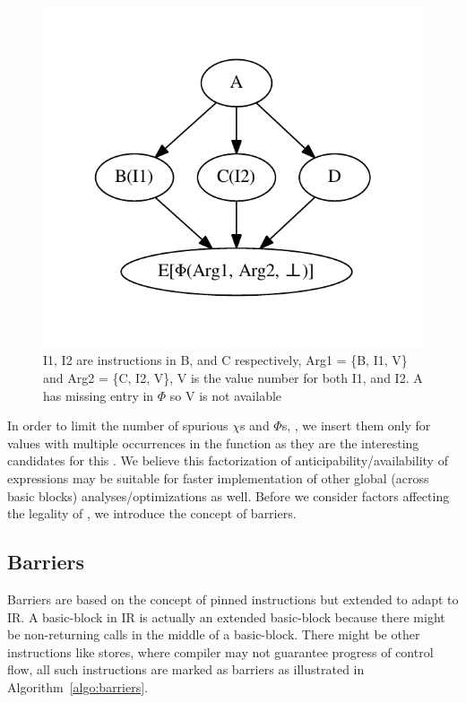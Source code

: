\documentclass[sigplan,10pt,review,anonymous]{acmart}\settopmatter{printfolios=true,printccs=false,printacmref=false}
\begin{document}
\begin{figure}[h]
  \includegraphics[scale=0.55]{phi-example.pdf}
  \vspace*{-1.0cm}
  \caption{I1, I2 are instructions in B, and C respectively, Arg1 = \{B, I1, V\}
  and Arg2 = \{C, I2, V\}, V is the value number for both I1, and I2. A has
  missing entry in $\Phi$ so V is not available}
\label{fig:phi-intro}
\end{figure}

In order to limit the number of spurious $\chi$s and $\Phi$s,
\cite{ssapre-improv}, we insert them only for values with multiple occurrences
in the function as they are the interesting candidates for this \GCM{}. We
believe this factorization of anticipability/availability of expressions may be
suitable for faster implementation of other global (across basic blocks)
analyses/optimizations as well. Before we consider factors affecting the
legality of \GCM{}, we introduce the concept of barriers.

\subsection{Barriers}
\label{subsec:barriers}
Barriers are based on the concept of pinned instructions \cite{click1995global}
but extended to adapt to \LLVM{} IR. A basic-block in \LLVM{} IR is actually an
extended basic-block \cite{ebb} because there might be non-returning calls in
the middle of a basic-block. There might be other instructions like stores,
where compiler may not guarantee progress of control flow, all such instructions
are marked as barriers as illustrated in Algorithm~\ref{algo:barriers}.
\end{document}
